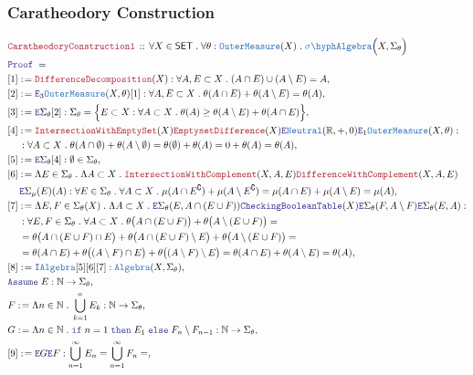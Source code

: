 \documentclass[12pt]{scrartcl}
\newcommand{\TYPE}[1]{\textcolor{NavyBlue}{\mathtt{#1}}}
\newcommand{\LOGIC}[1]{\textcolor{Blue}{\mathtt{#1}}}
\newcommand{\THM}[1]{\textcolor{Maroon}{\mathtt{#1}}}
\renewcommand{\.}{\; . \;}
\newcommand{\de}{: \kern 0.1pc =}
\newcommand{\If}{\LOGIC{if} \;}
\newcommand{\Then}{ \; \LOGIC{then} \;}
\newcommand{\Else}{\; \LOGIC{else} \;}
\newcommand{\Theorem}[2]{& \THM{#1} \, :: \, #2 \\ & \Proof = \\ }
\newcommand{\NewLine}{\\ & \kern 1pc}
\newcommand{\Page}[1]{ \begin{align*} #1 \end{align*}   }
\newcommand{\Intro}{\LOGIC{I}}
\newcommand{\Elim}{\LOGIC{E}}
\newcommand{\Reals}{\mathbb{R} }
\newcommand{\Nat}{\mathbb{N} }
\renewcommand{\c}{\complement}
\newcommand{\Say}[3]{& #1 \de #2 : #3, \\}
\newcommand{\Assume}[2]{& \LOGIC{Assume} \; #1 : #2, \\}
\newcommand{\Proof}{\LOGIC{Proof} \; }
\newcommand{\SA}{\TYPE{\sigma \hyph Algebra}}
\newcommand{\SET}{\mathsf{SET}}
\newcommand{\Alg}{\TYPE{Algebra}}
\newcommand{\OM}{\TYPE{OuterMeasure}}
\begin{document}
\subsubsection{Caratheodory Construction}
\Page{
	\Theorem{CaratheodoryConstruction1}
	{
		\forall X \in \SET \.
		\forall \theta : \OM(X)	\.
		\SA\Big(X,\Sigma_\theta\Big)
	}
	\Say{[1]}{\THM{DifferenceDecomposition}(X)}
	{
		\forall A,E \subset X \.   (A \cap E) \cup (A \setminus E) = A
	}
	\Say{[2]}{\Elim_3 \OM(X,\theta)[1]}
	{
		\forall A,E \subset X \.
		\theta(A \cap E)  + \theta(A \setminus E) = \theta(A)
	}
	\Say{[3]}{\Elim \Sigma_\theta [2]}
	{
		\Sigma_\theta =
		\Big\{
				E \subset X : 
				 \forall A \subset X \. \theta(A) \ge \theta(A \setminus E) + \theta(A \cap E)
		\Big\}
	}
	\Say{[4]}{
		\THM{IntersectionWithEmptySet}(X)
		\THM{EmptysetDifference}(X)
		\Elim \TYPE{Neutral}(\Reals,+,0)
		\Elim_1 \OM(X,\theta)
	}	
	{
			\NewLine :
			\forall A \subset X \.
			\theta(A \cap \emptyset) + \theta(A \setminus \emptyset) =
			\theta(\emptyset) + \theta(A) = 
			0 + \theta(A) =
			\theta(A)	
	}
	\Say{[5]}{\Elim \Sigma_\theta [4]}
	{
		 \emptyset \in \Sigma_\theta
	}
	\Say{[6]}
	{
		\Lambda E \in \Sigma_\theta \.
		\Lambda A \subset X \.
		\THM{IntersectionWithComplement}(X,A,E)
		\THM{DifferenceWithComplement}(X,A,E)
		\NewLine 
		\Elim \Sigma_\mu(E)(A)
	}
	{
		\forall E \in \Sigma_\theta \.
		\forall A \subset X \.
		\mu(A \cap E^\c)   +\mu(A \setminus E^\c)=
		\mu(A \cap E)   +\mu(A \setminus E) =
		\mu(A)
	}
	\Say{[7]}
	{
		\Lambda E,F \in \Sigma_\theta(X) \.
		\Lambda A \subset X \.
		\Elim \Sigma_\theta(E, A \cap (E \cup F))
		\LOGIC{CheckingBooleanTable}(X)
		\Elim \Sigma_\theta(F, A \setminus F) 
		\Elim \Sigma_\theta(E,A)
	}
	{
		\NewLine :		
		\forall E,F \in \Sigma_\theta \.
		\forall A \subset X \.
		\theta\big(A \cap (E \cup F)\big) + 
		\theta\big( A \setminus (E \cup F) \big) = \NewLine =
		\theta\big(A \cap (E \cup F) \cap E \big) +
		\theta\big(A \cap (E \cup F) \setminus E \big)  +
		\theta\big( A \setminus (E \cup F) \big) = \NewLine =
		\theta(A \cap E ) +
		\theta\big( (A \setminus F) \cap  E \big) +
		\theta\big( (A \setminus F) \setminus E \big) = 
		\theta(A \cap E) + \theta(A \setminus E)	=
		\theta(A)	
	}
	\Say{[8]}{\Intro \Alg [5][6][7]}
	{
		\Alg(X,\Sigma_\theta)
	}
	\Assume{E}{\Nat \to \Sigma_\theta}
	\Say{F}{\Lambda n \in \Nat \. \bigcup^n_{k=1} E_k}
	{
		\Nat \to \Sigma_\theta
	}
	\Say{G}{\Lambda n \in \Nat \. \If n = 1 \Then E_1 \Else F_n \setminus F_{n-1}}
	{
		\Nat \to \Sigma_\theta
	}
	\Say{[9]}{\Elim G \Elim F
		}{
			\bigcup^\infty_{n=1} E_n = 
			\bigcup^\infty_{n=1} F_n =
}}
\end{document}
